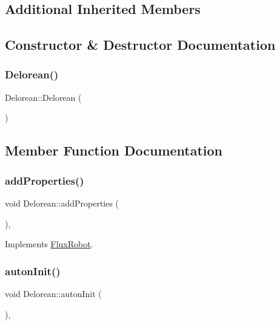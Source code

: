 \subsection*{Additional Inherited Members}


\subsection{Constructor \& Destructor Documentation}
\mbox{\label{classDelorean_a80afc6fe9ba8edac0af62189b8afbbd3}} 
\subsubsection{\texorpdfstring{Delorean()}{Delorean()}}
{\footnotesize\ttfamily Delorean\+::\+Delorean (\begin{DoxyParamCaption}{ }\end{DoxyParamCaption})}



\subsection{Member Function Documentation}
\mbox{\label{classDelorean_a2baeb249408fd1d61da69b1edd832554}} 
\subsubsection{\texorpdfstring{add\+Properties()}{addProperties()}}
{\footnotesize\ttfamily void Delorean\+::add\+Properties (\begin{DoxyParamCaption}{ }\end{DoxyParamCaption})\hspace{0.3cm}{\ttfamily [override]}, {\ttfamily [virtual]}}



Implements \hyperlink{classFluxRobot_a6f7940d8f82e80a6e405bad20ec9a5a5}{Flux\+Robot}.

\mbox{\label{classDelorean_ad06990e5c59d5f4d30b48015e744cc49}} 
\subsubsection{\texorpdfstring{auton\+Init()}{autonInit()}}
{\footnotesize\ttfamily void Delorean\+::auton\+Init (\begin{DoxyParamCaption}{ }\end{DoxyParamCaption})\hspace{0.3cm}{\ttfamily [override]}, {\ttfamily [virtual]}}



